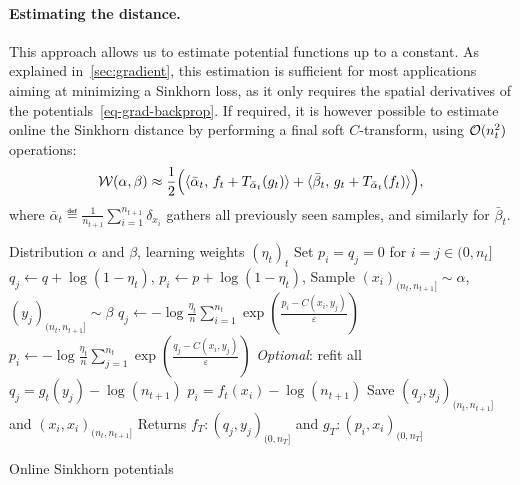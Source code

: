 \paragraph{Estimating the distance.} 

This approach allows us to estimate potential functions up to a constant. As explained in~\autoref{sec:gradient},
this estimation is sufficient for most applications aiming at minimizing a Sinkhorn loss, as it only requires the spatial derivatives of the potentials~\eqref{eq-grad-backprop}. 
%
If required, it is however possible to estimate online the Sinkhorn distance  by performing a final soft $C$-transform, using $\Oo(n_t^2)$ operations:
\begin{equation}
    \Ww(\alpha,\beta) \approx \frac{1}{2}\Big(\dotp{\bar \alpha_t}{f_t + \Ctrans{g_t}{\bar \alpha_t}}
     + \dotp{\bar \beta_t}{g_t + \Ctrans{f_t}{\bar \alpha_t}}\Big),
\end{equation}
where $\bar \alpha_t \eqdef \frac{1}{n_{t+1}}\sum_{i=1}^{n_{t+1}} \delta_{x_i}$
gathers all previously seen samples, and similarly for $\bar \beta_t$.

\begin{algorithm}[t]
    \begin{algorithmic}
    \Input Distribution $\alpha$ and $\beta$, learning weights ${(\eta_t)}_t$
    \State Set $p_i = q_j = 0$ for $i = j \in (0, n_t]$
        \For{$i = j \in (0, n_t]$}
        \State $q_j \gets q + \log(1 - \eta_t)$, $p_i \gets p + \log(1 - \eta_t)$,
        \EndFor
        \State Sample $(x_i)_{(n_t, n_{t+1}]} \sim \alpha$, $(y_j)_{(n_t, n_{t+1}]} \sim \beta$
        \For{$i = j \in (n_t, n_{t+1}]$}
            \State $q_j \gets 
            - \log \frac{\eta_t}{n} 
            \sum_{i=1}^{n_t} \exp(\frac{p_i - C(x_i, y_j)}{\varepsilon})$
            \State $p_i \gets 
            - \log \frac{\eta_t}{n} 
            \sum_{j=1}^{n_t} \exp(\frac{q_j - C(x_i, y_j)}{\varepsilon})$
        \EndFor
        \State \textit{Optional}: refit all $q_j = g_t(y_j) - \log (n_{t+1})$
        \State\hspace{2.45cm} $p_i = f_t(x_i) - \log (n_{t+1})$
        \State Save $(q_j, y_j)_{(n_t,n_{t+1}]}$ and $(x_i, x_i)_{(n_t,n_{t+1}]}$
    \EndFor
    \State Returns $f_T : (q_j, y_j)_{(0, n_T]}$ and
    $g_T : (p_i, x_i)_{(0, n_T]}$
    \end{algorithmic}
    \caption{Online Sinkhorn potentials}\label{alg:online_sinkhorn}
\end{algorithm}


